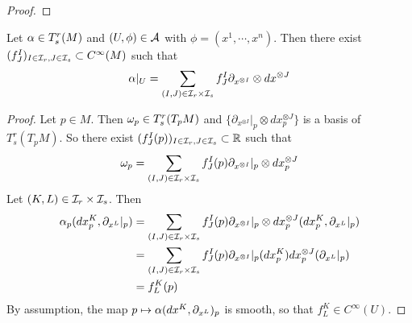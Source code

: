 \documentclass{book}
\begin{document}
	
	\begin{ex}
	
	\end{ex}
	
	\begin{proof}
	
	\end{proof}
	
	\begin{ex}
		Let $\alpha \in T^r_s(M)$ and $(U, \phi) \in \mathcal{A}$ with $\phi = (x^1, \cdots, x^n)$. Then there exist $(f^I_J)_{I \in \mathcal{I}_r, J \in \mathcal{I}_s} \subset C^{\infty}(M)$ such that $$\alpha|_U = \sum_{(I,J) \in \mathcal{I}_r \times \mathcal{I}_s} f^I_J \partial_{x^{\otimes I}} \otimes dx^{\otimes J}$$ 
	\end{ex}

	\begin{proof}
		Let $p \in M$. Then $\omega_p \in T^r_s(T_pM)$ and $\bigg \{\partial_{x^{\otimes I}}|_p \otimes dx^{\otimes J}_p \bigg \}$ is a basis of $T^r_s(T_pM)$. So there exist $(f^I_J(p))_{I \in \mathcal{I}_r, J \in \mathcal{I}_s } \subset \mathbb{R}$ such that $$\omega_p = \sum\limits_{(I,J) \in \mathcal{I}_r \times \mathcal{I}_s } f^I_J(p) \partial_{x^{\otimes I}}|_p \otimes dx^{\otimes J}_p $$
		Let $(K,L) \in \mathcal{I}_r \times \mathcal{I}_s$. Then 
		\begin{align*}
		\alpha_p(dx^K_p, \partial_{x^L}|_p) 
		&=  \sum\limits_{(I,J) \in \mathcal{I}_r \times \mathcal{I}_s } f^I_J(p) \partial_{x^{\otimes I}}|_p \otimes dx^{\otimes J}_p(dx^K_p, \partial_{x^L}|_p) \\
		&= \sum\limits_{(I,J) \in \mathcal{I}_r \times \mathcal{I}_s } f^I_J(p) \partial_{x^{\otimes I}}|_p (dx^K_p) dx^{\otimes J}_p(\partial_{x^L}|_p)  \\
		&= f^K_L(p)
		\end{align*}
		By assumption, the map $p \mapsto \alpha(dx^K, \partial_{x^L})_p$ is smooth, so that $f^K_L \in C^{\infty}(U)$.
	
	\end{proof}
	
	\begin{defn}
	
	\end{defn}	
	
	
	
	
	
	
	
	
	
	
	
	
	
	
	
	
	
	
	
	
	
\end{document}
